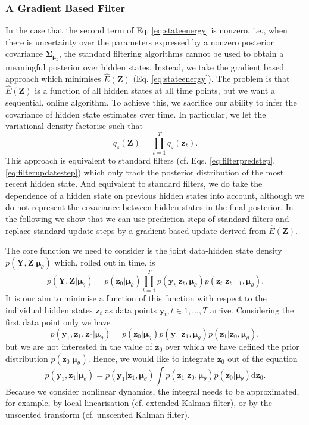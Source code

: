 \documentclass[a4paper,10pt]{article}
\newcommand{\bs}[1]{\mathbf{#1}}					%
\newcommand{\bgs}[1]{\boldsymbol{#1}}				%
\newcommand{\ud}{\mathrm{d}}					%
\newcommand{\eq}[1]{\begin{equation} #1 \end{equation}}%
\renewcommand{\ss}{z}         %
\newcommand{\so}{y}         %
\newcommand{\spm}{\mu}    %
\renewcommand{\sp}{\theta}    %
\newcommand{\ps}{\bs{\ss}}    %
\newcommand{\po}{\bs{\so}}    %
\newcommand{\ppm}{\bgs{\spm}}   %
\newcommand{\Ps}{\bs{Z}}    %
\newcommand{\Po}{\bs{Y}}    %
\newcommand{\Cov}{\bgs{\Sigma}}			%
\begin{document}
\subsubsection{A Gradient Based Filter}
In the case that the second term of Eq. \ref{eq:stateenergy} is nonzero, i.e., when there is uncertainty over the parameters expressed by a nonzero posterior covariance $\Cov_{\ppm_\sp}$, the standard filtering algorithms cannot be used to obtain a meaningful posterior over hidden states. Instead, we take the gradient based approach which minimises $\hat{E}(\Ps)$ (Eq. \ref{eq:stateenergy}). The problem is that $\hat{E}(\Ps)$ is a function of all hidden states at all time points, but we want a sequential, online algorithm. To achieve this, we sacrifice our ability to infer the covariance of hidden state estimates over time. In particular, we let the variational density factorise such that 
\eq{
    q_\ss(\Ps) = \prod_{t=1}^T q_\ss(\ps_t).
}
This approach is equivalent to standard filters (cf. Eqs. \ref{eq:filterpredstep}, \ref{eq:filterupdatestep}) which only track the posterior distribution of the most recent hidden state. And equivalent to standard filters, we do take the dependence of a hidden state on previous hidden states into account, although we do not represent the covariance between hidden states in the final posterior. In the following we show that we can use prediction steps of standard filters and replace standard update steps by a gradient based update derived from $\hat{E}(\Ps)$.

The core function we need to consider is the joint data-hidden state density $p(\Po,\Ps|\ppm_\sp)$ which, rolled out in time, is
\eq{
    p(\Po,\Ps|\ppm_\sp) = p(\ps_0|\ppm_\sp)\prod_{t=1}^T p(\po_t|\ps_t,\ppm_\sp)p(\ps_t|\ps_{t-1},\ppm_\sp).
}
It is our aim to minimise a function of this function with respect to the individual hidden states $\ps_t$ as data points $\po_t, t \in 1,\dots,T$ arrive. Considering the first data point only we have
\eq{
    p(\po_1,\ps_1,\ps_0|\ppm_\sp) = p(\ps_0|\ppm_\sp)p(\po_1|\ps_1,\ppm_\sp)p(\ps_1|\ps_0,\ppm_\sp),
}
but we are not interested in the value of $\ps_0$ over which we have defined the prior distribution $p(\ps_0|\ppm_\sp)$. Hence, we would like to integrate $\ps_0$ out of the equation
\eq{\label{eq:prevstateintegral}
    p(\po_1,\ps_1|\ppm_\sp) = p(\po_1|\ps_1,\ppm_\sp)\int p(\ps_1|\ps_0,\ppm_\sp)p(\ps_0|\ppm_\sp) \ud\ps_0.
}
Because we consider nonlinear dynamics, the integral needs to be approximated, for example, by local linearisation (cf. extended Kalman filter), or by the unscented transform (cf. unscented Kalman filter).
\end{document}
